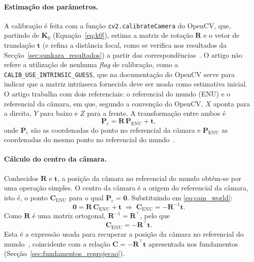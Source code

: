 \paragraph{Estimação dos parâmetros.} A calibração é feita com a função \texttt{cv2.calibrateCamera} do OpenCV, que, partindo de $\mathbf{K}_0$ (Equação~\eqref{eq:k0}), estima a matriz de rotação $\mathbf{R}$ e o vetor de translação $\mathbf{t}$ (e refina a distância focal, como se verifica nos resultados da Secção~\ref{sec:sunkara_resultados}) a partir das correspondências~\cite{sunkara2025}. O artigo não refere a utilização de nenhuma \textit{flag} de calibração, como a \texttt{CALIB\_USE\_INTRINSIC\_GUESS}, que na documentação do OpenCV serve para indicar que a matriz intrínseca fornecida deve ser usada como estimativa inicial. O artigo trabalha com dois referenciais: o referencial do mundo (ENU) e o referencial da câmara, em que, segundo a convenção do OpenCV, $X$ aponta para a direita, $Y$ para baixo e $Z$ para a frente. A transformação entre ambos é
\begin{equation}
    \mathbf{P}_c=\mathbf{R}\,\mathbf{P}_{\mathrm{ENU}}+\mathbf{t},
    \label{eq:cam_world}
\end{equation}
onde $\mathbf{P}_c$ são as coordenadas do ponto no referencial da câmara e $\mathbf{P}_{\mathrm{ENU}}$ as coordenadas do mesmo ponto no referencial do mundo~\cite{sunkara2025}.

\paragraph{Cálculo do centro da câmara.} Conhecidos $\mathbf{R}$ e $\mathbf{t}$, a posição da câmara no referencial do mundo obtém-se por uma operação simples. O centro da câmara é a origem do referencial da câmara, isto é, o ponto $\mathbf{C}_{\mathrm{ENU}}$ para o qual $\mathbf{P}_c=\mathbf{0}$. Substituindo em \eqref{eq:cam_world}:
\begin{equation}
    \mathbf{0}=\mathbf{R}\,\mathbf{C}_{\mathrm{ENU}}+\mathbf{t}
    \;\Rightarrow\;
    \mathbf{C}_{\mathrm{ENU}}=-\mathbf{R}^{-1}\mathbf{t}.
\end{equation}
Como $\mathbf{R}$ é uma matriz ortogonal, $\mathbf{R}^{-1}=\mathbf{R}^{\top}$, pelo que
\begin{equation}
    \mathbf{C}_{\mathrm{ENU}}=-\mathbf{R}^{\top}\mathbf{t}.
    \label{eq:cam_center}
\end{equation}
Esta é a expressão usada para recuperar a posição da câmara no referencial do mundo~\cite{sunkara2025}, coincidente com a relação $\mathbf{C}=-\mathbf{R}^{\top}\mathbf{t}$ apresentada nos fundamentos (Secção~\ref{sec:fundamentos_reprojecao}).


